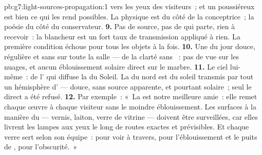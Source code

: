 \begin{solution}{pb:g7:light-sources-propagation:1}
vers les yeux des visiteurs~; et un  poussiéreux est bien ce qui
les rend possibles. La physique est du côté de la conceptrice~; la
poésie du côté du conservateur.
\textbf{9.} Pas de source, pas de  qui parte, rien à recevoir~:
la blancheur est un fort taux de transmission appliqué à rien. La
première condition échoue pour tous les objets à la fois.
\textbf{10.} Une  du jour douce, régulière et sans  sur
toute la salle --- de la clarté sans ~: pas de vue sur les
nuages, et aucun éblouissement solaire direct sur le marbre.
\textbf{11.} Le ciel lui-même~: de l' qui diffuse la  du
Soleil. La  du nord est du soleil transmis par tout un
hémisphère d' --- douce, sans source apparente, et pourtant
solaire~; seul le  direct a été refusé.
\textbf{12.} Par exemple~: «~La  est notre meilleure amie~:
elle remet chaque œuvre à chaque visiteur sans le moindre
éblouissement. Les surfaces à la manière du  --- vernis,
laiton, verre de vitrine --- doivent être surveillées, car elles
livrent les lampes aux yeux le long de routes exactes et prévisibles.
Et chaque verre sert selon son équipe~:  pour voir à
travers,  pour l'éblouissement et le puits de ,
 pour l'obscurité.~»
\end{solution}
